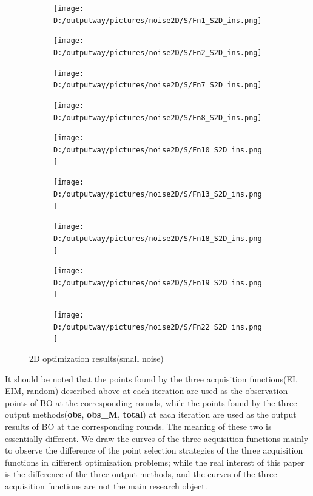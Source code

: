 \documentclass{article}
\begin{document}
\begin{figure}[H]
    \centering
    \begin{subfigure}[t]{.32\linewidth}
        \centering
        \texttt{[image: D:/outputway/pictures/noise2D/S/Fn1\_S2D\_ins.png]}
    \end{subfigure}
    \begin{subfigure}[t]{.32\linewidth}
        \centering
        \texttt{[image: D:/outputway/pictures/noise2D/S/Fn2\_S2D\_ins.png]}
    \end{subfigure}
    \begin{subfigure}[t]{.32\linewidth}
        \centering
        \texttt{[image: D:/outputway/pictures/noise2D/S/Fn7\_S2D\_ins.png]}
    \end{subfigure}
    \begin{subfigure}[t]{.32\linewidth}
        \centering
        \texttt{[image: D:/outputway/pictures/noise2D/S/Fn8\_S2D\_ins.png]}
    \end{subfigure}
    \begin{subfigure}[t]{.32\linewidth}
        \centering
        \texttt{[image: D:/outputway/pictures/noise2D/S/Fn10\_S2D\_ins.png]}
    \end{subfigure}
    \begin{subfigure}[t]{.32\linewidth}
        \centering
        \texttt{[image: D:/outputway/pictures/noise2D/S/Fn13\_S2D\_ins.png]}
    \end{subfigure}
    \begin{subfigure}[t]{.32\linewidth}
        \centering
        \texttt{[image: D:/outputway/pictures/noise2D/S/Fn18\_S2D\_ins.png]}
    \end{subfigure}
    \begin{subfigure}[t]{.32\linewidth}
        \centering
        \texttt{[image: D:/outputway/pictures/noise2D/S/Fn19\_S2D\_ins.png]}
    \end{subfigure}
    \begin{subfigure}[t]{.32\linewidth}
        \centering
        \texttt{[image: D:/outputway/pictures/noise2D/S/Fn22\_S2D\_ins.png]}
    \end{subfigure}
    \caption{2D optimization results(small noise)}
    \label{Fig2}
\end{figure}

\hspace{2em}It should be noted that the points found by the three acquisition functions(EI, EIM, random) described above at each iteration are used as the observation points of BO at the corresponding rounds, while the points found by the three output methods(\textbf{obs}, \textbf{obs\_M}, \textbf{total}) at each iteration are used as the output results of BO at the corresponding rounds. The meaning of these two is essentially different. We draw the curves of the three acquisition functions mainly to observe the difference of the point selection strategies of the three acquisition functions in different optimization problems; while the real interest of this paper is the difference of the three output methods, and the curves of the three acquisition functions are not the main research object. 
\end{document}
